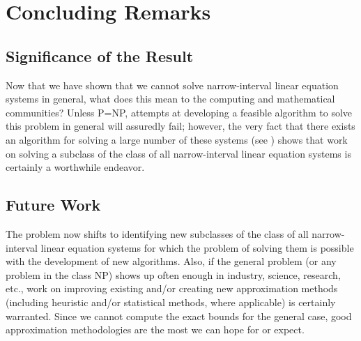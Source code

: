 
\chapter{Concluding Remarks}

\section{Significance of the Result}

Now that we have shown that we cannot solve narrow-interval 
linear equation systems in general, what does this mean to the computing and 
mathematical communities?  Unless P=NP, attempts at developing a feasible 
algorithm to solve this problem in general will assuredly fail; however, the 
very fact that there exists an algorithm for solving a large number of these 
systems (see \cite{Lakeyev1995}) shows that work on solving a subclass of the 
class of all narrow-interval linear equation systems is certainly a worthwhile 
endeavor.

\section{Future Work}

The problem now shifts to identifying new subclasses of the class of all
narrow-interval linear equation systems for which the problem of solving them
is possible with the development of new algorithms.  Also, if the general
problem (or any problem in the class NP) shows up often enough in industry,
science, research, etc., work on improving existing and/or creating new
approximation methods (including heuristic and/or statistical methods, where
applicable) is certainly warranted.  Since we cannot compute the exact bounds
for the general case, good approximation methodologies are the most we can
hope for or expect.
